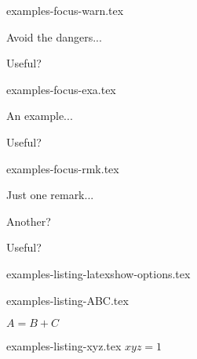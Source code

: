 \begin{filecontents*}[overwrite]{examples-focus-warn.tex}
\begin{tdocwarn}
    Avoid the dangers...
\end{tdocwarn}

\begin{tdocwarn}
    Useful?
\end{tdocwarn}
\end{filecontents*}


\begin{filecontents*}[overwrite]{examples-focus-exa.tex}
\begin{tdocexa}
    An example...
\end{tdocexa}

\begin{tdocexa}
    Useful?
\end{tdocexa}
\end{filecontents*}


\begin{filecontents*}[overwrite]{examples-focus-rmk.tex}
\begin{tdocrem}
    Just one remark...
\end{tdocrem}

\begin{tdocrem}
    Another?
\end{tdocrem}

\begin{tdocrem}
    Useful?
\end{tdocrem}
\end{filecontents*}


\begin{filecontents*}[overwrite]{examples-listing-latexshow-options.tex}
\end{filecontents*}


\begin{filecontents*}[overwrite]{examples-listing-ABC.tex}
\begin{tdoclatex}[sbs]
    $A = B + C$
\end{tdoclatex}
\end{filecontents*}


\begin{filecontents*}[overwrite]{examples-listing-xyz.tex}
$x y z = 1$
\end{filecontents*}


